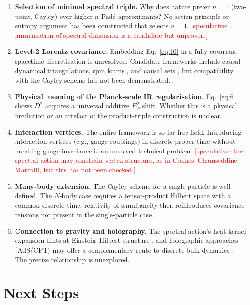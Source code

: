 \documentclass[11pt,a4paper]{article}
\begin{document}
\begin{enumerate}
  \item \textbf{Selection of minimal spectral triple.} Why does nature prefer $n=1$ (two-point, Cayley) over higher-$n$ Padé approximants? No action principle or entropy argument has been constructed that selects $n=1$. \textcolor{red}{[speculative: minimisation of spectral dimension is a candidate but unproven.]}

  \item \textbf{Level-2 Lorentz covariance.} Embedding Eq.~\eqref{eq:10} in a fully covariant spacetime discretisation is unresolved. Candidate frameworks include causal dynamical triangulations, spin foams \cite{thiemann1996,ashtekar2004}, and causal sets \cite{henson2006}, but compatibility with the Cayley scheme has not been demonstrated.

  \item \textbf{Physical meaning of the Planck-scale IR regularisation.} Eq.~\eqref{eq:6} shows $D^2$ acquires a universal additive $E_P^2$ shift. Whether this is a physical prediction or an artefact of the product-triple construction is unclear.

  \item \textbf{Interaction vertices.} The entire framework is so far free-field. Introducing interaction vertices (e.g., gauge couplings) in discrete proper time without breaking gauge invariance is an unsolved technical problem. \textcolor{red}{[speculative: the spectral action may constrain vertex structure, as in Connes--Chamseddine--Marcolli, but this has not been checked.]}

  \item \textbf{Many-body extension.} The Cayley scheme for a single particle is well-defined. The $N$-body case requires a tensor-product Hilbert space with a common discrete time; relativity of simultaneity then reintroduces covariance tensions not present in the single-particle case.

  \item \textbf{Connection to gravity and holography.} The spectral action's heat-kernel expansion hints at Einstein--Hilbert structure \cite{ashtekar2004}, and holographic approaches (AdS/CFT) may offer a complementary route to discrete bulk dynamics \cite{maldacena1997,witten1998,skenderis2002}. The precise relationship is unexplored.
\end{enumerate}

\section{Next Steps}
\end{document}
